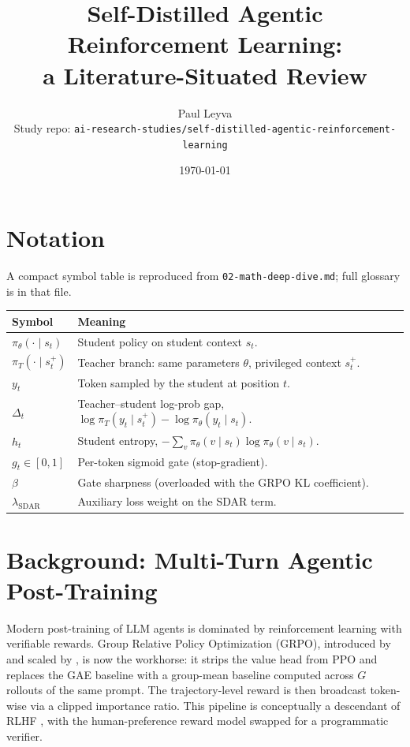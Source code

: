 \documentclass[11pt]{article}
\title{Self-Distilled Agentic Reinforcement Learning: \\
       a Literature-Situated Review}
\author{Paul Leyva \\ \small Study repo: \texttt{ai-research-studies/self-distilled-agentic-reinforcement-learning}}
\date{\today}
\begin{document}
\maketitle

\section*{Notation}

A compact symbol table is reproduced from \texttt{02-math-deep-dive.md}; full
glossary is in that file.

\begin{center}
\begin{tabular}{ll}
\hline
Symbol & Meaning \\
\hline
$\pi_\theta(\cdot \mid s_t)$ & Student policy on student context $s_t$. \\
$\pi_T(\cdot \mid s_t^+)$    & Teacher branch: same parameters $\theta$, privileged context $s_t^+$. \\
$y_t$                        & Token sampled by the student at position $t$. \\
$\Delta_t$                   & Teacher--student log-prob gap, $\log\pi_T(y_t\mid s_t^+) - \log\pi_\theta(y_t\mid s_t)$. \\
$h_t$                        & Student entropy, $-\sum_v \pi_\theta(v\mid s_t)\log\pi_\theta(v\mid s_t)$. \\
$g_t \in [0,1]$              & Per-token sigmoid gate (stop-gradient). \\
$\beta$                      & Gate sharpness (overloaded with the GRPO KL coefficient). \\
$\lambda_{\mathrm{SDAR}}$    & Auxiliary loss weight on the SDAR term. \\
\hline
\end{tabular}
\end{center}

\section*{Background: Multi-Turn Agentic Post-Training}

Modern post-training of LLM agents is dominated by reinforcement learning
with verifiable rewards. Group Relative Policy Optimization (GRPO),
introduced by \citet{shao2024deepseekmath} and scaled by
\citet{deepseek2025r1}, is now the workhorse: it strips the value head
from PPO \citep{schulman2017ppo} and replaces the GAE baseline with a
group-mean baseline computed across $G$ rollouts of the same prompt. The
trajectory-level reward is then broadcast token-wise via a clipped
importance ratio. This pipeline is conceptually a descendant of RLHF
\citep{christiano2017deep, ouyang2022instructgpt}, with the human-preference
reward model swapped for a programmatic verifier.
\end{document}
